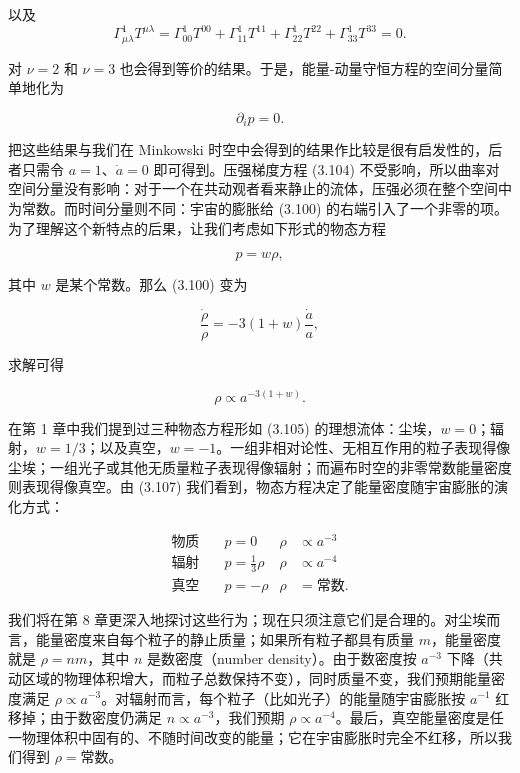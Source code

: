以及
\begin{equation*}
\Gamma^1_{\mu\lambda} T^{\mu\lambda} = \Gamma^1_{00} T^{00} + \Gamma^1_{11} T^{11} + \Gamma^1_{22} T^{22} + \Gamma^1_{33} T^{33} = 0. \tag{3.103}
\end{equation*}

对 $\nu=2$ 和 $\nu=3$ 也会得到等价的结果。于是，能量-动量守恒方程的空间分量简单地化为

\begin{equation*}
\partial_i p = 0. \tag{3.104}
\end{equation*}

把这些结果与我们在 Minkowski 时空中会得到的结果作比较是很有启发性的，后者只需令 $a=1$、$\dot a =0$ 即可得到。压强梯度方程 (3.104) 不受影响，所以曲率对空间分量没有影响：对于一个在共动观者看来静止的流体，压强必须在整个空间中为常数。而时间分量则不同：宇宙的膨胀给 (3.100) 的右端引入了一个非零的项。为了理解这个新特点的后果，让我们考虑如下形式的物态方程

\begin{equation*}
p = w\rho, \tag{3.105}
\end{equation*}

其中 $w$ 是某个常数。那么 (3.100) 变为

\begin{equation*}
\frac{\dot\rho}{\rho} = -3(1+w)\frac{\dot a}{a}, \tag{3.106}
\end{equation*}

求解可得

\begin{equation*}
\rho \propto a^{-3(1+w)}. \tag{3.107}
\end{equation*}

在第 1 章中我们提到过三种物态方程形如 (3.105) 的理想流体：尘埃，$w=0$；辐射，$w=1/3$；以及真空，$w=-1$。一组非相对论性、无相互作用的粒子表现得像尘埃；一组光子或其他无质量粒子表现得像辐射；而遍布时空的非零常数能量密度则表现得像真空。由 (3.107) 我们看到，物态方程决定了能量密度随宇宙膨胀的演化方式：

\begin{align*}
\text{物质}\quad & p = 0 & \rho &\propto a^{-3}\\
\text{辐射}\quad & p = \tfrac{1}{3}\rho & \rho &\propto a^{-4}\\
\text{真空}\quad & p = -\rho & \rho &= \text{常数}. \tag{3.108}
\end{align*}

我们将在第 8 章更深入地探讨这些行为；现在只须注意它们是合理的。对尘埃而言，能量密度来自每个粒子的静止质量；如果所有粒子都具有质量 $m$，能量密度就是 $\rho = nm$，其中 $n$ 是数密度（number density）。由于数密度按 $a^{-3}$ 下降（共动区域的物理体积增大，而粒子总数保持不变），同时质量不变，我们预期能量密度满足 $\rho \propto a^{-3}$。对辐射而言，每个粒子（比如光子）的能量随宇宙膨胀按 $a^{-1}$ 红移掉；由于数密度仍满足 $n \propto a^{-3}$，我们预期 $\rho \propto a^{-4}$。最后，真空能量密度是任一物理体积中固有的、不随时间改变的能量；它在宇宙膨胀时完全不红移，所以我们得到 $\rho = \text{常数}$。


